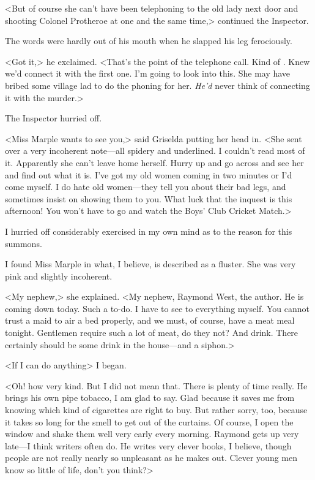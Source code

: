 <But of course she can't have been telephoning to the old lady next door and shooting Colonel Protheroe at one and the same time,> continued the Inspector.

The words were hardly out of his mouth when he slapped his leg ferociously.

<Got it,> he exclaimed. <That's the point of the telephone call. Kind of . Knew we'd connect it with the first one. I'm going to look into this. She may have bribed some village lad to do the phoning for her. \emph{He'd} never think of connecting it with the murder.>

The Inspector hurried off.

<Miss Marple wants to see you,> said Griselda putting her head in. <She sent over a very incoherent note—all spidery and underlined. I couldn't read most of it. Apparently she can't leave home herself. Hurry up and go across and see her and find out what it is. I've got my old women coming in two minutes or I'd come myself. I do hate old women—they tell you about their bad legs, and sometimes insist on showing them to you. What luck that the inquest is this afternoon! You won't have to go and watch the Boys' Club Cricket Match.>

I hurried off considerably exercised in my own mind as to the reason for this summons.

I found Miss Marple in what, I believe, is described as a fluster. She was very pink and slightly incoherent.

<My nephew,> she explained. <My nephew, Raymond West, the author. He is coming down today. Such a to-do. I have to see to everything myself. You cannot trust a maid to air a bed properly, and we must, of course, have a meat meal tonight. Gentlemen require such a lot of meat, do they not? And drink. There certainly should be some drink in the house—and a siphon.>

<If I can do anything\longdash> I began.

<Oh! how very kind. But I did not mean that. There is plenty of time really. He brings his own pipe tobacco, I am glad to say. Glad because it saves me from knowing which kind of cigarettes are right to buy. But rather sorry, too, because it takes so long for the smell to get out of the curtains. Of course, I open the window and shake them well very early every morning. Raymond gets up very late—I think writers often do. He writes very clever books, I believe, though people are not really nearly so unpleasant as he makes out. Clever young men know so little of life, don't you think?>

